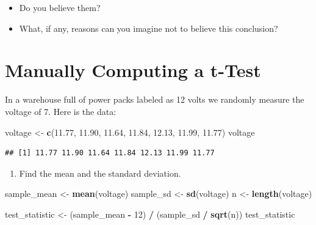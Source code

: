 \documentclass[
]{book}
\newenvironment{Shaded}{\begin{snugshade}}{\end{snugshade}}
\newcommand{\DecValTok}[1]{\textcolor[rgb]{0.00,0.00,0.81}{#1}}
\newcommand{\FloatTok}[1]{\textcolor[rgb]{0.00,0.00,0.81}{#1}}
\newcommand{\FunctionTok}[1]{\textcolor[rgb]{0.13,0.29,0.53}{\textbf{#1}}}
\newcommand{\NormalTok}[1]{#1}
\newcommand{\OtherTok}[1]{\textcolor[rgb]{0.56,0.35,0.01}{#1}}
\newcommand{\SpecialCharTok}[1]{\textcolor[rgb]{0.81,0.36,0.00}{\textbf{#1}}}
\providecommand{\tightlist}{%
  \setlength{\itemsep}{0pt}\setlength{\parskip}{0pt}}
\theoremstyle{definition}
\theoremstyle{definition}
\theoremstyle{definition}
\theoremstyle{definition}
\theoremstyle{remark}
\begin{document}
\begin{itemize}
\tightlist
\item
  Do you believe them?
\item
  What, if any, reasons can you imagine not to believe this conclusion?
\end{itemize}

\section{Manually Computing a t-Test}\label{manually-computing-a-t-test}

In a warehouse full of power packs labeled as 12 volts we randomly measure the voltage of 7. Here is the data:

\begin{Shaded}
\begin{Highlighting}[]
\NormalTok{voltage }\OtherTok{\textless{}{-}} \FunctionTok{c}\NormalTok{(}\FloatTok{11.77}\NormalTok{, }\FloatTok{11.90}\NormalTok{, }\FloatTok{11.64}\NormalTok{, }\FloatTok{11.84}\NormalTok{, }\FloatTok{12.13}\NormalTok{, }\FloatTok{11.99}\NormalTok{,  }\FloatTok{11.77}\NormalTok{)}
\NormalTok{voltage}
\end{Highlighting}
\end{Shaded}

\begin{verbatim}
## [1] 11.77 11.90 11.64 11.84 12.13 11.99 11.77
\end{verbatim}

\begin{enumerate}
\def\labelenumi{\arabic{enumi}.}
\tightlist
\item
  Find the mean and the standard deviation.
\end{enumerate}

\begin{Shaded}
\begin{Highlighting}[]
\NormalTok{sample\_mean }\OtherTok{\textless{}{-}} \FunctionTok{mean}\NormalTok{(voltage)}
\NormalTok{sample\_sd   }\OtherTok{\textless{}{-}} \FunctionTok{sd}\NormalTok{(voltage)}
\NormalTok{n           }\OtherTok{\textless{}{-}} \FunctionTok{length}\NormalTok{(voltage)}

\NormalTok{test\_statistic }\OtherTok{\textless{}{-}}\NormalTok{ (sample\_mean }\SpecialCharTok{{-}} \DecValTok{12}\NormalTok{) }\SpecialCharTok{/}\NormalTok{ (sample\_sd }\SpecialCharTok{/} \FunctionTok{sqrt}\NormalTok{(n))}
\NormalTok{test\_statistic}
\end{Highlighting}
\end{Shaded}
\end{document}
